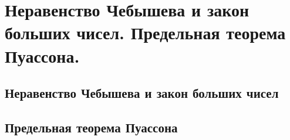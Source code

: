 \chapter{Неравенство Чебышева и закон больших чисел. Предельная теорема Пуассона.}
\section{Неравенство Чебышева и закон больших чисел}
\section{Предельная теорема Пуассона}